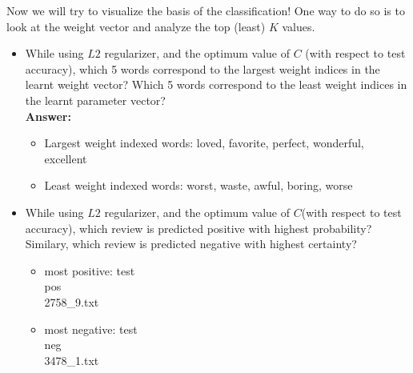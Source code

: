\documentclass{article}
\begin{document}
Now we will try to visualize the basis of the classification! One way to do so is to look at the weight vector and analyze the top (least) $K$ values.
\begin{itemize}
	\item While using $L2$ regularizer, and the optimum value of $C$ (with respect to test accuracy), which 5 words correspond to the largest weight indices in the learnt weight vector? Which 5 words correspond to the least weight indices in the learnt parameter vector?
	\\\textbf{Answer:}\\
	\begin{itemize}
		\item Largest weight indexed words: loved, favorite, perfect, wonderful, excellent
		\item Least weight indexed words: worst, waste, awful, boring, worse
	\end{itemize}
	
	\item While using $L2$ regularizer, and the optimum value of $C$(with respect to test accuracy), which review is predicted positive with highest probability? Similary, which review is predicted negative with highest certainty?
	
	\begin{itemize}
		\item most positive: test\\pos\\2758\_9.txt
		\item most negative: test\\neg\\3478\_1.txt
	\end{itemize}
\end{itemize}
\end{document}

